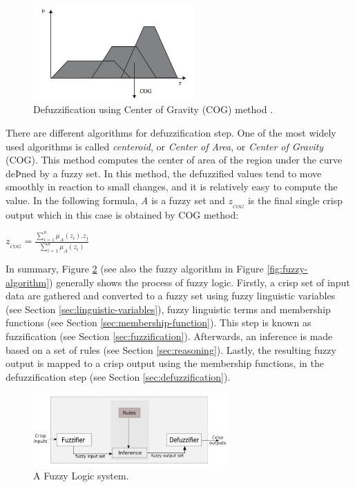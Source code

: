 \documentclass[11pt]{article}
\begin{document}
\begin{figure}[tbh]
  \center
  \includegraphics[width=0.55\textwidth]{figure/cog.png}
  \caption{Defuzzification using Center of Gravity (COG) method
  \cite{antonio:cog-defuzzification}.}
  \label{fig:defuzzification}
\end{figure}

There are different algorithms for defuzzification step. One of the most
widely used algorithms is called \textit{centeroid}, or \textit{Center of
Area}, or \textit{Center of Gravity} (COG). This method computes the center of
area of the region under the curve deÞned by a fuzzy set. In this method, the
defuzzified values tend to move smoothly in reaction to small changes, and it is
relatively easy to compute the value. In the following formula, \textit{A} is
a fuzzy set and $z_{_{COG}}$ is the final single crisp output which in this case
is obtained by COG method:\\

\begin{center}
$z_{_{COG}} = \frac{\sum\limits_{i=1}^{n} \mu_A(z_i).z_j}{\sum\limits_{i=1}^{n}
\mu_A(z_i)}$
\end{center}

In summary, Figure \ref{fig:fuzzy-system} (see also the fuzzy algorithm in
Figure \ref{fig:fuzzy-algorithm}) generally shows the process of fuzzy logic.
Firstly, a crisp set of input data are gathered and converted to a fuzzy set
using fuzzy linguistic variables (see Section \ref{sec:linguistic-variables}),
fuzzy linguistic terms and membership functions (see Section
\ref{sec:membership-function}). This step is known as fuzzification (see
Section \ref{sec:fuzzification}). Afterwards, an inference is made based on a
set of rules (see Section \ref{sec:reasoning}). Lastly, the resulting fuzzy
output is mapped to a crisp output using the membership functions, in the
defuzzification step (see Section \ref{sec:defuzzification}).

\begin{figure}[tbh]
  \center
  \includegraphics[width=0.66\textwidth]{figure/fuzzy-system.png}
  \caption{A Fuzzy Logic system.}
  \label{fig:fuzzy-system}
\end{figure}
\end{document}
